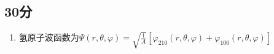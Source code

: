 
\subsection{30分}
\begin{enumerate}
\item 氢原子波函数为$\varPsi (r,\theta,\varphi)=\sqrt{\frac{1}{A}}[\varphi_{210}(r,\theta,\varphi)+\varphi_{100}(r,\theta,\varphi)]$
\end{enumerate}